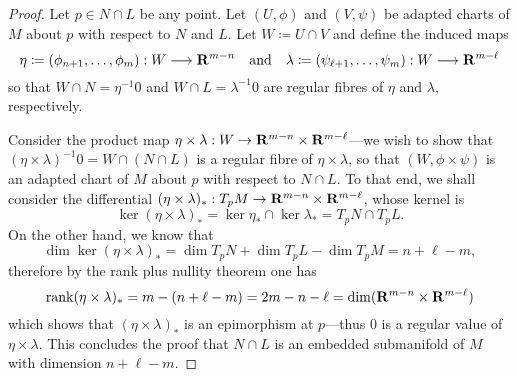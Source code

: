\begin{proof}
    Let \(p \in N \cap L\) be any point. Let \((U, \phi)\) and \((V, \psi)\) be
    adapted charts of \(M\) about \(p\) with respect to \(N\) and \(L\). Let
    \(W \coloneq U \cap V\) and define the induced maps
    \[
        \eta \coloneq (\phi_{n+1}, \dots, \phi_m): W \longrightarrow \mathbf{R}^{m-n}
        \quad \text{and} \quad
        \lambda \coloneq (\psi_{\ell+1}, \dots, \psi_m): W \longrightarrow \mathbf{R}^{m-\ell}
    \]
    so that \(W \cap N = \eta^{-1} 0\) and \(W \cap L = \lambda^{-1} 0\) are regular
    fibres of \(\eta\) and \(\lambda\), respectively.

    Consider the product map
    \(\eta \times \lambda: W \to \mathbf{R}^{m-n} \times \mathbf{R}^{m-\ell}\)---we wish to show
    that \((\eta \times \lambda)^{-1} 0 = W \cap (N \cap L)\) is a regular fibre of
    \(\eta \times \lambda\), so that \((W, \phi \times \psi)\) is an adapted chart
    of \(M\) about \(p\) with respect to \(N \cap L\). To that end, we shall
    consider the differential
    \((\eta \times \lambda)_{*}: T_p M \to \mathbf{R}^{m - n} \times \mathbf{R}^{m - \ell}\), whose
    kernel is
    \[
        \ker(\eta \times \lambda)_{*} = \ker \eta_{*} \cap \ker \lambda_{*}
        = T_p N \cap T_p L.
    \]
    On the other hand, we know that
    \[
        \dim \ker(\eta \times \lambda)_{*}
        = \dim T_p N + \dim T_p L - \dim T_p M
        = n + \ell - m,
    \]
    therefore by the rank plus nullity theorem one has
    \[
        \operatorname{rank}(\eta \times \lambda)_{*} = m - (n + \ell - m) = 2 m - n - \ell
        = \dim (\mathbf{R}^{m-n} \times \mathbf{R}^{m-\ell})
    \]
    which shows that \((\eta \times \lambda)_{*}\) is an epimorphism at \(p\)---thus
    \(0\) is a regular value of \(\eta \times \lambda\). This concludes the proof
    that \(N \cap L\) is an embedded submanifold of \(M\) with dimension
    \(n + \ell - m\).

\end{proof}


